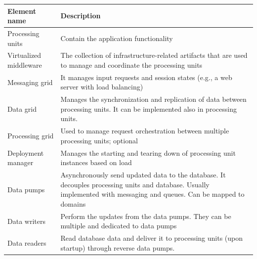 \begin{table}[h!]
  \renewcommand{\arraystretch}{1.4}
  \centering
  \begin{tabularx}{\textwidth}{l X}
    \toprule
    \textbf{Element name}  & \textbf{Description}                                                                                                                                                  \\
    \midrule
    Processing units       & Contain the application functionality                                                                                                                                 \\
    Virtualized middleware & The collection of infrastructure-related artifacts that are used to manage and coordinate the processing units                                                        \\
    Messaging grid         & It manages input requests and session states (e.g., a web server with load balancing)                                                                                 \\
    Data grid              & Manages the synchronization and replication of data between processing units. It can be implemented also in processing units.                                         \\
    Processing grid        & Used to manage request orchestration between multiple processing units; optional                                                                                      \\
    Deployment manager     & Manages the starting and tearing down of processing unit instances based on load                                                                                      \\
    Data pumps             & Asynchronously send updated data to the database. It decouples processing units and database. Usually implemented with messaging and queues. Can be mapped to domains \\
    Data writers           & Perform the updates from the data pumps. They can be multiple and dedicated to data pumps                                                                             \\
    Data readers           & Read database data and deliver it to processing units (upon startup) through reverse data pumps.                                                                      \\
    \bottomrule
  \end{tabularx}
\end{table}

